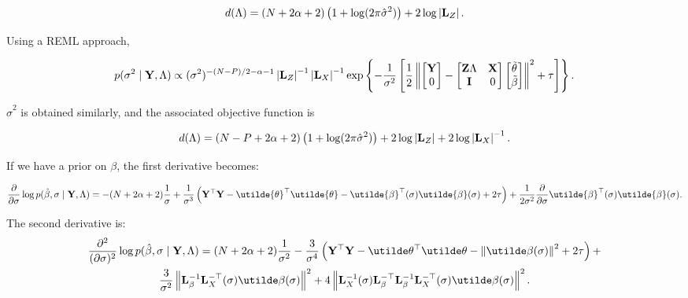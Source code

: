 \documentclass[10pt]{article}
\begin{document}
\begin{equation*}
d(\Lambda) = (N + 2\alpha + 2)\left(1 + \log(2 \pi\hat\sigma^2)\right)
+ 2 \log\left|{\bf L}_Z\right|.
\end{equation*}

Using a REML approach,

\begin{equation*}
p(\sigma^2 \mid {\bf Y}, \Lambda) \propto (\sigma^2)^{-(N - P)/2 -
  \alpha - 1} \left|{\bf L}_Z\right|^{-1} \left|{\bf L}_X\right|^{-1}
\exp\left\{-\frac{1}{\sigma^2}\left[ \frac{1}{2}
\left\|\begin{bmatrix} {\bf Y} \\ 0 \end{bmatrix} -
\begin{bmatrix} {\bf Z}\Lambda & {\bf X} \\ {\bf I} & 0 \end{bmatrix}
\begin{bmatrix}\tilde\theta \\ \tilde\beta \end{bmatrix} \right\|^2 +
\tau
\right]\right\}.
\end{equation*}

$\hat\sigma^2$ is obtained similarly, and the associated objective function is

\begin{equation*}
d(\Lambda) = (N - P + 2\alpha + 2)\left(1 + \log(2 \pi\hat\sigma^2)\right)
+ 2 \log\left|{\bf L}_Z\right| + 2\log\left|{\bf L}_X\right|^{-1}.
\end{equation*}

If we have a prior on $\beta$, the first derivative becomes:

\begin{equation*}
\frac{\partial}{\partial\sigma}
\log p(\hat\beta, \sigma \mid {\bf Y}, \Lambda) =
-(N + 2\alpha + 2)\frac{1}{\sigma} + \frac{1}{\sigma^3}\left({\bf
    Y}^\top{\bf Y} - \utilde{\theta}^\top\utilde{\theta} -
  \utilde{\beta}^\top(\sigma)\utilde{\beta}(\sigma) +2\tau\right) +
\frac{1}{2\sigma^2}\frac{\partial}{\partial\sigma}
\utilde{\beta}^\top(\sigma)\utilde{\beta}(\sigma).
\end{equation*}

The second derivative is:
\begin{multline*}
\frac{\partial^2}{(\partial\sigma)^2}
\log p(\hat\beta, \sigma \mid {\bf Y}, \Lambda) =
(N + 2\alpha + 2) \frac{1}{\sigma^2} - \frac{3}{\sigma^4} \left({\bf Y}^\top{\bf
    Y}-\utilde\theta^\top\utilde\theta
  -\left\|\utilde\beta(\sigma)\right\|^2 + 2\tau\right) + \\
\frac{3}{\sigma^2}\left\| {\bf L}_\beta^{-1}{\bf
    L}_X^{-\top}(\sigma)\utilde\beta(\sigma) \right\|^2 +
4\left\| {\bf L}_X^{-1}(\sigma){\bf L}_\beta^{-\top} {\bf L}_\beta^{-1}{\bf
    L}_X^{-\top}(\sigma)\utilde\beta(\sigma) \right\|^2.
\end{multline*}
\end{document}
